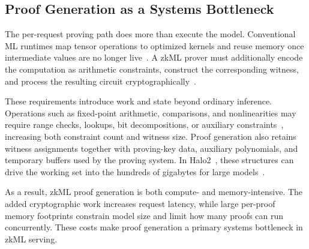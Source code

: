 \subsection{Proof Generation as a Systems Bottleneck}
\label{sec:proving-bottleneck}

The per-request proving path does more than execute the model. Conventional ML runtimes map tensor operations to optimized kernels and reuse memory once intermediate values are no longer live~\cite{chen2018tvm,rotem2018glow}. A zkML prover must additionally encode the computation as arithmetic constraints, construct the corresponding witness, and process the resulting circuit cryptographically~\cite{chen2024zkml}.

These requirements introduce work and state beyond ordinary inference. Operations such as fixed-point arithmetic, comparisons, and nonlinearities may require range checks, lookups, bit decompositions, or auxiliary constraints~\cite{chen2024zkml,kang2024scaling,liu2021zkcnn}, increasing both constraint count and witness size. Proof generation also retains witness assignments together with proving-key data, auxiliary polynomials, and temporary buffers used by the proving system. In Halo2~\cite{halo2}, these structures can drive the working set into the hundreds of gigabytes for large models~\cite{chen2024zkml}.

As a result, zkML proof generation is both compute- and memory-intensive. The added cryptographic work increases request latency, while large per-proof memory footprints constrain model size and limit how many proofs can run concurrently. These costs make proof generation a primary systems bottleneck in zkML serving.





